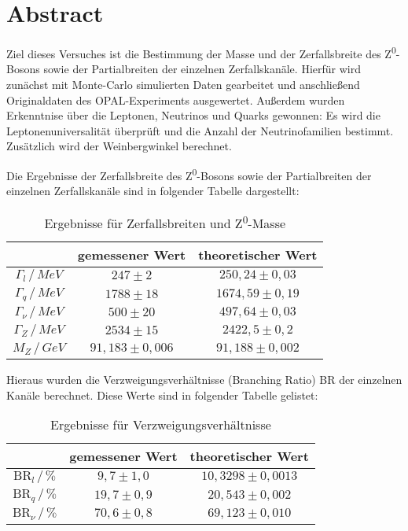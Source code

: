 \section*{Abstract}

Ziel dieses Versuches ist die Bestimmung der Masse und der Zerfallsbreite des Z\textsuperscript0-Bosons sowie der Partialbreiten der einzelnen Zerfallskanäle. Hierfür wird zunächst mit Monte-Carlo simulierten Daten gearbeitet und anschließend Originaldaten des OPAL-Experiments ausgewertet. Außerdem wurden Erkenntnise über die Leptonen, Neutrinos und Quarks gewonnen: Es wird die Leptonenuniversalität überprüft und die Anzahl der Neutrinofamilien bestimmt. Zusätzlich wird der Weinbergwinkel berechnet.

Die Ergebnisse der Zerfallsbreite des Z\textsuperscript0-Bosons sowie der Partialbreiten der einzelnen Zerfallskanäle sind in folgender Tabelle dargestellt:

\begin{table}[bh]
	\centering
	\begin{tabular}{c|cc}
		&gemessener Wert&theoretischer Wert\\\hline
		$\Gamma_l\,/\,\si{MeV}$&$247\pm2$&$250,24\pm0,03$\\
		$\Gamma_q\,/\,\si{MeV}$&$1788\pm18$&$1674,59\pm0,19$\\
		$\Gamma_\nu\,/\,\si{MeV}$&$500\pm20$&$497,64\pm0,03$\\
		$\Gamma_Z\,/\,\si{MeV}$&$2534\pm15$&$2422,5\pm0,2$\\
		$M_Z\,/\,\si{GeV}$&$91,183\pm0,006$&$91,188\pm0,002$
	\end{tabular}
	\caption{Ergebnisse für Zerfallsbreiten und Z\textsuperscript0-Masse}
	\label{tab:abstractergebnisse}
\end{table}

Hieraus wurden die Verzweigungsverhältnisse (Branching Ratio) BR der einzelnen Kanäle berechnet. Diese Werte sind in folgender Tabelle gelistet:

\begin{table}[bh]
	\centering
	\begin{tabular}{c|cc}
		&gemessener Wert&theoretischer Wert\\\hline
		$\mathrm{BR}_l\,/\,\si{\%}$&$9,7\pm1,0$&$10,3298\pm0,0013$\\
		$\mathrm{BR}_q\,/\,\si{\%}$&$19,7\pm0,9$&$20,543\pm0,002$\\
		$\mathrm{BR}_\nu\,/\,\si{\%}$&$70,6\pm0,8$&$69,123\pm0,010$
	\end{tabular}
	\caption{Ergebnisse für Verzweigungsverhältnisse}
	\label{tab:abstractbranch}
\end{table}

